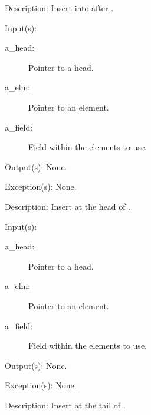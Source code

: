 \begin{capi}
\begin{capilist}
	\item[Description: ]
		Insert  into  after .
	\end{capilist}
\label{ql_head_insert}
	\begin{capilist}
	\item[Input(s): ]
		\begin{description}\item[]
		\item[a\_head: ]
			Pointer to a  head.
		\item[a\_elm: ]
			Pointer to an element.
		\item[a\_field: ]
			Field within the  elements to use.
		\end{description}
	\item[Output(s): ] None.
	\item[Exception(s): ] None.
	\item[Description: ]
		Insert  at the head of .
	\end{capilist}
\label{ql_tail_insert}
	\begin{capilist}
	\item[Input(s): ]
		\begin{description}\item[]
		\item[a\_head: ]
			Pointer to a \classname{ql} head.
		\item[a\_elm: ]
			Pointer to an element.
		\item[a\_field: ]
			Field within the  elements to use.
		\end{description}
	\item[Output(s): ] None.
	\item[Exception(s): ] None.
	\item[Description: ]
		Insert  at the tail of \cvar{a\_head}.
	\end{capilist}
\label{ql_remove}
	\begin{capilist}

\end{capilist}
\end{capi}
